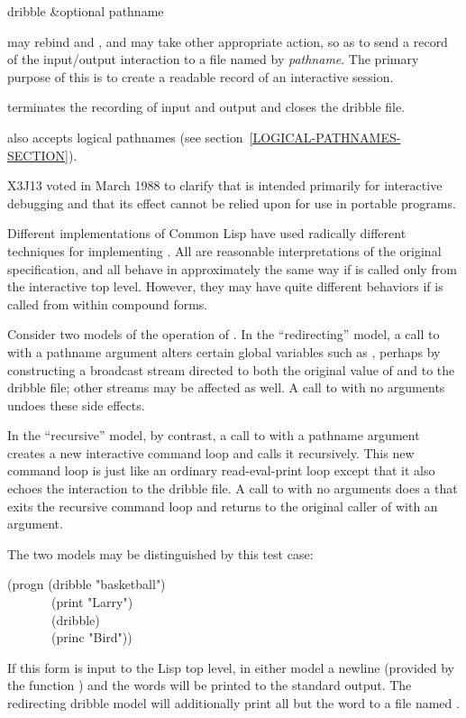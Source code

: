 \begin{defun}[Function]
dribble &optional pathname

 may rebind 
and , and may take other appropriate
action, so as to send a record of the
input/output interaction to a file named by \emph{pathname}.
The primary purpose of this is to create a readable record of an interactive
session.

 terminates the recording of input and output and
closes the dribble file.

 also accepts logical pathnames (see
section~\ref{LOGICAL-PATHNAMES-SECTION}).

\begin{new}
X3J13 voted in March 1988
to clarify that  is intended primarily
for interactive debugging and that its effect cannot be
relied upon for use in portable
programs.

Different implementations of Common Lisp have used radically different
techniques for implementing .  All are reasonable interpretations
of the original specification, and all behave in approximately the same
way if  is called only from the interactive top level.
However, they may have quite different behaviors if  is
called from within compound forms.

Consider two models of the operation of .  In the ``redirecting''
model, a call to  with a pathname argument
alters certain global variables such as ,
perhaps by constructing a broadcast stream directed to both the original
value of  and to the dribble file; other streams
may be affected as well.  A call to  with no arguments
undoes these side effects.

In the ``recursive'' model, by contrast, a call to  with a
pathname argument creates a new interactive command loop and calls it
recursively.  This new command loop is just like an ordinary
read-eval-print loop except that it also echoes the interaction to
the dribble file.  A call to  with no arguments
does a  that exits the recursive command loop and returns
to the original caller of  with an argument.

The two models may be distinguished by this test case:
\begin{lisp}
(progn (dribble "basketball") \\
~~~~~~~(print "Larry") \\
~~~~~~~(dribble) \\
~~~~~~~(princ "Bird"))
\end{lisp}
If this form is input to the Lisp top level, in either model
a newline (provided by the function ) and the words
 will be printed to the standard output.
The redirecting dribble model will additionally print all but the word
 to a file named .


\end{new}
\end{defun}
